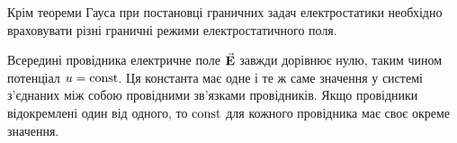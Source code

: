 \begin{remark}
	Крім теореми Гауса при постановці граничних задач електростатики необхідно враховувати різні граничні режими електростатичного поля.
\end{remark}

\begin{example}
	Всередині провідника електричне поле ${\vec{\mathbf{E}}}$ завжди дорівнює нулю, таким чином потенціал $u = \operatorname{const}$. Ця константа має одне і те ж саме значення у системі з'єднаних між собою провідними зв'язками провідників. Якщо провідники відокремлені один від одного, то $\operatorname{const}$ для кожного провідника має своє окреме значення.
\end{example}


